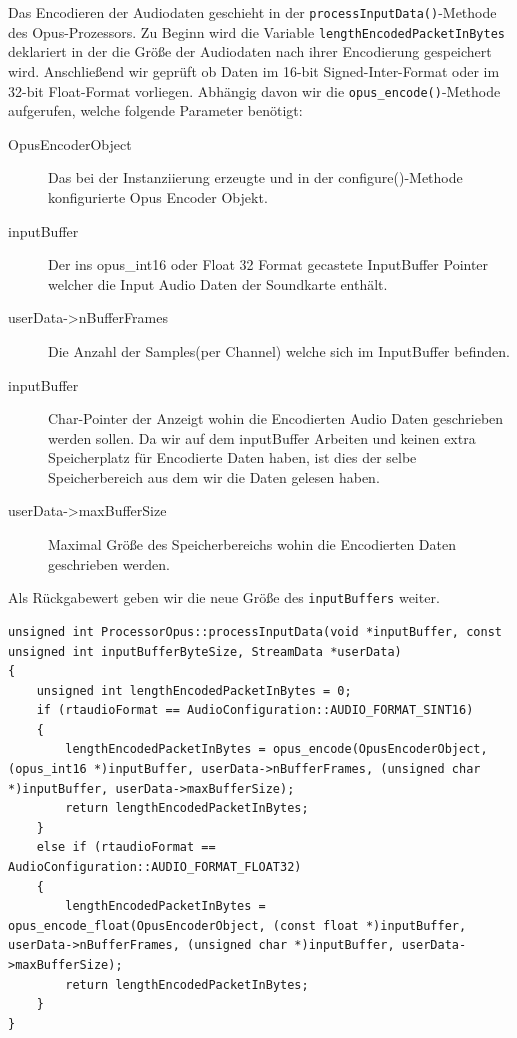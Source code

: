 Das Encodieren der Audiodaten geschieht in der \texttt{processInputData()}-Methode des Opus-Prozessors. Zu Beginn wird die Variable \texttt{lengthEncodedPacketInBytes} deklariert in der die Größe der Audiodaten nach ihrer Encodierung gespeichert wird. Anschließend wir geprüft ob Daten im 16-bit Signed-Inter-Format oder im 32-bit Float-Format vorliegen.
Abhängig davon wir die \texttt{opus\_encode()}-Methode aufgerufen, welche folgende Parameter benötigt:

\begin{description}
\item[OpusEncoderObject] Das bei der Instanziierung erzeugte und in der configure()-Methode konfigurierte Opus Encoder Objekt.
\item[inputBuffer] Der ins opus\_int16 oder Float 32 Format gecastete InputBuffer Pointer welcher die Input Audio Daten der Soundkarte enthält.
\item[userData->nBufferFrames] Die Anzahl der Samples(per Channel) welche sich im InputBuffer befinden.
\item[inputBuffer] Char-Pointer der Anzeigt wohin die Encodierten Audio Daten geschrieben werden sollen. Da wir auf dem inputBuffer Arbeiten und keinen extra Speicherplatz für Encodierte Daten haben, ist dies der selbe Speicherbereich aus dem wir die Daten gelesen haben.
\item[userData->maxBufferSize] Maximal Größe des Speicherbereichs wohin die Encodierten Daten geschrieben werden.
\end{description}

Als Rückgabewert geben wir die neue Größe des \texttt{inputBuffers} weiter. 


\begin{lstlisting}[caption={Encodieren von Audio Daten mittels Opus},label={Code:Opus}]
unsigned int ProcessorOpus::processInputData(void *inputBuffer, const unsigned int inputBufferByteSize, StreamData *userData)
{
    unsigned int lengthEncodedPacketInBytes = 0;
    if (rtaudioFormat == AudioConfiguration::AUDIO_FORMAT_SINT16)
    {
        lengthEncodedPacketInBytes = opus_encode(OpusEncoderObject, (opus_int16 *)inputBuffer, userData->nBufferFrames, (unsigned char *)inputBuffer, userData->maxBufferSize);
        return lengthEncodedPacketInBytes;
    }
    else if (rtaudioFormat == AudioConfiguration::AUDIO_FORMAT_FLOAT32)
    {
        lengthEncodedPacketInBytes = opus_encode_float(OpusEncoderObject, (const float *)inputBuffer, userData->nBufferFrames, (unsigned char *)inputBuffer, userData->maxBufferSize);
        return lengthEncodedPacketInBytes;
    }
}
\end{lstlisting}

